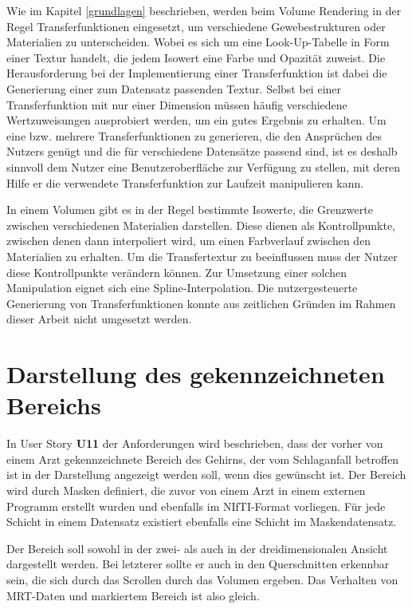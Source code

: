 Wie im Kapitel \ref{grundlagen} beschrieben, werden beim Volume Rendering in der Regel Transferfunktionen eingesetzt, um verschiedene Gewebestrukturen oder Materialien zu unterscheiden. Wobei es sich um eine Look-Up-Tabelle in Form einer Textur handelt, die jedem Isowert eine Farbe und Opazität zuweist.
Die Herausforderung bei der Implementierung einer Transferfunktion ist dabei die Generierung einer zum Datensatz passenden Textur. Selbst bei einer Transferfunktion mit nur einer Dimension müssen häufig verschiedene Wertzuweisungen ausprobiert werden, um ein gutes Ergebnis zu erhalten.
Um eine bzw. mehrere Transferfunktionen zu generieren, die den Ansprüchen des Nutzers genügt und die für verschiedene Datensätze passend sind, ist es deshalb sinnvoll dem Nutzer eine Benutzeroberfläche zur Verfügung zu stellen, mit deren Hilfe er die verwendete Transferfunktion zur Laufzeit manipulieren kann. 

In einem Volumen gibt es in der Regel bestimmte Isowerte, die Grenzwerte zwischen verschiedenen Materialien darstellen. Diese dienen als Kontrollpunkte, zwischen denen dann interpoliert wird, um einen Farbverlauf zwischen den Materialien zu erhalten. 
Um die Transfertextur zu beeinflussen muss der Nutzer diese Kontrollpunkte verändern können. Zur Umsetzung einer solchen Manipulation eignet sich eine Spline-Interpolation. 
Die nutzergesteuerte Generierung von Transferfunktionen konnte aus zeitlichen Gründen im Rahmen dieser Arbeit nicht umgesetzt werden.


\section{Darstellung des gekennzeichneten Bereichs}
\label{maske}


In User Story \textbf{U11} der Anforderungen wird beschrieben, dass der vorher von einem Arzt gekennzeichnete Bereich des Gehirns, der vom Schlaganfall betroffen ist in der Darstellung angezeigt werden soll, wenn dies gewünscht ist. 
Der Bereich wird durch Masken definiert, die zuvor von einem Arzt in einem externen Programm erstellt wurden und ebenfalls im NIfTI-Format vorliegen. Für jede Schicht in einem Datensatz existiert ebenfalls eine Schicht im Maskendatensatz. 

Der Bereich soll sowohl in der zwei- als auch in der dreidimensionalen Ansicht dargestellt werden. Bei letzterer sollte er auch in den Querschnitten erkennbar sein, die sich durch das Scrollen durch das Volumen ergeben. Das Verhalten von MRT-Daten und markiertem Bereich ist also gleich.

